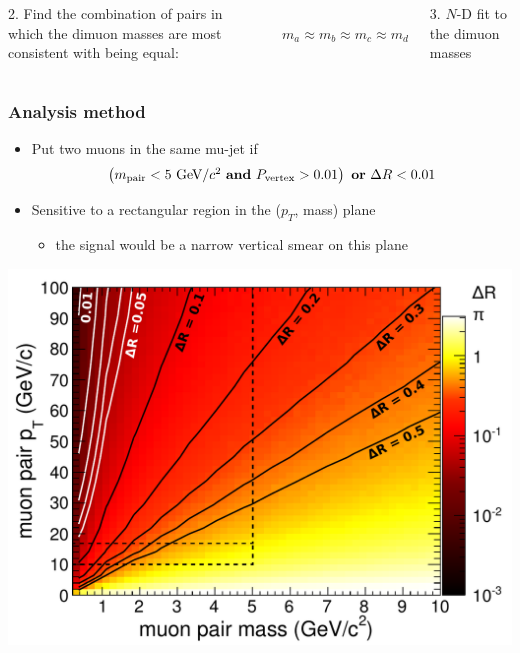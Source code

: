\documentclass[compress]{beamer}
\newcommand{\s}[1]{{\mbox{\scriptsize #1}}}
\begin{document}
\begin{frame}
\begin{columns}
2. Find the combination of pairs in which the dimuon masses are most consistent with being equal:

\mbox{ } \hfill $m_a \approx m_b \approx m_c \approx m_d$ \hfill \mbox{ }

\vspace{0.2 cm}
3. $N$-D fit to the dimuon masses
\end{columns}
\end{frame}

\begin{frame}
\frametitle{Analysis method}

\begin{itemize}
\item Put two muons in the same mu-jet if
\[ \left( m_\s{pair} < 5\mbox{ GeV/$c^2$ {\bf and} }P_\s{vertex} > 0.01\right)\mbox{ {\bf or} }\Delta R < 0.01 \]

\item Sensitive to a rectangular region in the ($p_T$, mass) plane
\begin{itemize}
\item the signal would be a narrow vertical smear on this plane
\end{itemize}
\end{itemize}

\begin{center}
\includegraphics[width=0.7\linewidth]{openingangle_dr.pdf}
\end{center}
\end{frame}
\end{document}
